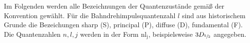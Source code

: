 Im Folgenden werden alle Bezeichnungen der Quantenzustände gemäß der Konvention gewählt.
Für die Bahndrehimpulsquantenzahl $l$ sind aus historischem Grunde die Bezeichungen 
sharp (S),
principal (P),
diffuse (D),
fundamental (F).
Die Quantenzahlen $n,l,j$ werden in der Form $\mathup{nl}_\mathup{j}$, beispielsweise $3D_{\sfrac{5}{2}}$ angegeben.
